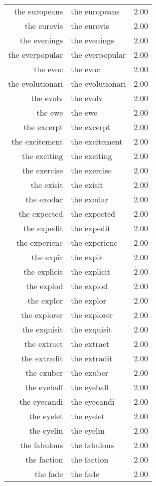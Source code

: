 \begin{table}[ht]
\begin{tabular}{rlr}
  the europeans & the europeans & 2.00 \\ 
  the eurovis & the eurovis & 2.00 \\ 
  the evenings & the evenings & 2.00 \\ 
  the everpopular & the everpopular & 2.00 \\ 
  the evoc & the evoc & 2.00 \\ 
  the evolutionari & the evolutionari & 2.00 \\ 
  the evolv & the evolv & 2.00 \\ 
  the ewe & the ewe & 2.00 \\ 
  the excerpt & the excerpt & 2.00 \\ 
  the excitement & the excitement & 2.00 \\ 
  the exciting & the exciting & 2.00 \\ 
  the exercise & the exercise & 2.00 \\ 
  the exisit & the exisit & 2.00 \\ 
  the exodar & the exodar & 2.00 \\ 
  the expected & the expected & 2.00 \\ 
  the expedit & the expedit & 2.00 \\ 
  the experienc & the experienc & 2.00 \\ 
  the expir & the expir & 2.00 \\ 
  the explicit & the explicit & 2.00 \\ 
  the explod & the explod & 2.00 \\ 
  the explor & the explor & 2.00 \\ 
  the explorer & the explorer & 2.00 \\ 
  the exquisit & the exquisit & 2.00 \\ 
  the extract & the extract & 2.00 \\ 
  the extradit & the extradit & 2.00 \\ 
  the exuber & the exuber & 2.00 \\ 
  the eyeball & the eyeball & 2.00 \\ 
  the eyecandi & the eyecandi & 2.00 \\ 
  the eyelet & the eyelet & 2.00 \\ 
  the eyelin & the eyelin & 2.00 \\ 
  the fabulous & the fabulous & 2.00 \\ 
  the faction & the faction & 2.00 \\ 
  the fade & the fade & 2.00 \\ 

\end{tabular}
\end{table}
